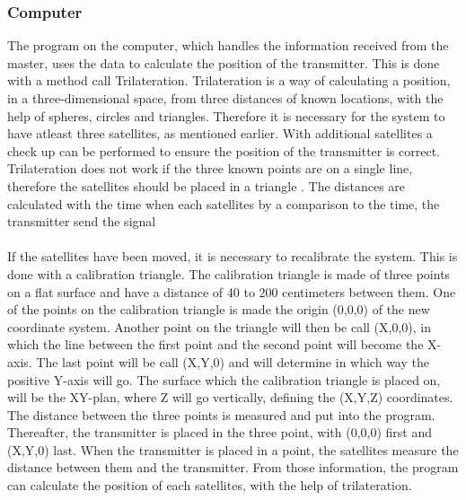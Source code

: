 \subsubsection{Computer}
The program on the computer, which handles the information received from the master, uses the data to calculate the position of the transmitter. This is done with a method call Trilateration. Trilateration is a way of calculating a position, in a three-dimensional space, from three distances of known locations, with the help of spheres, circles and triangles. Therefore it is necessary for the system to have atleast three satellites, as mentioned earlier.  With additional satellites a check up can be performed to ensure the position of the transmitter is correct. Trilateration does not work if the three known points are on a single line, therefore the satellites should be placed in a triangle . The distances are calculated with the time when each satellites by a comparison to the time, the transmitter send the signal\\\\
\noindent
If the satellites have been moved, it is necessary to recalibrate the system. This is done with a calibration triangle. The calibration triangle is made of three points on a flat surface and have a distance of 40 to 200 centimeters between them. One of the points on the calibration triangle is made the origin (0,0,0) of the new coordinate system. Another point on the triangle will then be call (X,0,0), in which the line between the first point and the second point will become the X-axis. The last point will be call (X,Y,0) and will determine in which way the positive Y-axis will go. The surface which the calibration triangle is placed on, will be the XY-plan, where Z will go vertically, defining the (X,Y,Z) coordinates. The distance between the three points is measured and put into the program. Thereafter, the transmitter is placed in the three point, with (0,0,0) first and (X,Y,0) last. When the transmitter is placed in a point, the satellites measure the distance between them and the transmitter. From those information, the program can calculate the position of each satellites, with the help of trilateration. \\\\

